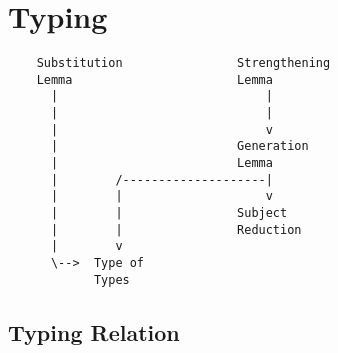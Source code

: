 \section{Typing}


{\scriptsize
\begin{verbatim}
    Substitution                Strengthening
    Lemma                       Lemma
      |                             |
      |                             |
      |                             v
      |                         Generation
      |                         Lemma
      |        /--------------------|
      |        |                    v
      |        |                Subject
      |        |                Reduction
      |        v
      \-->  Type of
            Types
\end{verbatim}
}





\subsection{Typing Relation}

\begin{comment}
\end{comment}

